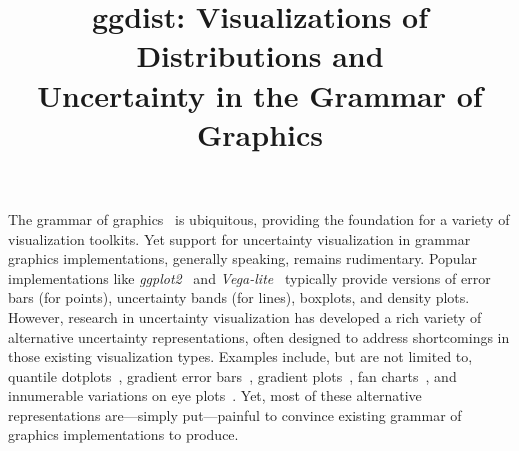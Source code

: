 \documentclass[journal]{vgtc}                     %
\title{ggdist: Visualizations of Distributions and\\Uncertainty in the Grammar of Graphics}
\author{%
  \authororcid{Matthew Kay}{0000-0001-9446-0419}
}
\begin{document}


\maketitle



The grammar of graphics~\cite{wilkinson2012grammar} is ubiquitous, providing the foundation for a variety of visualization toolkits. Yet support for uncertainty visualization in grammar graphics implementations, generally speaking, remains rudimentary. Popular implementations like \textit{ggplot2}~\cite{wickham2010layered,wickham2011ggplot2} and \textit{Vega-lite}~\cite{satyanarayan2016vega} typically provide versions of error bars (for points), uncertainty bands (for lines), boxplots, and density plots. However, research in uncertainty visualization has developed a rich variety of alternative uncertainty representations, often designed to address shortcomings in those existing visualization types. Examples include, but are not limited to, quantile dotplots~\cite{kay2016ish,fernandes2018uncertainty}, gradient error bars~\cite{correll2014error}, gradient plots~\cite{bowman2019graphics,jackson2008displaying}, fan charts~\cite{jackson2008displaying}, and innumerable variations on eye plots~\cite{helske2021can,kay2016ish,barrowman2003raindrop,spiegelhalter1999surgical}. Yet, most of these alternative representations are---simply put---painful to convince existing grammar of graphics implementations to produce.
\end{document}

